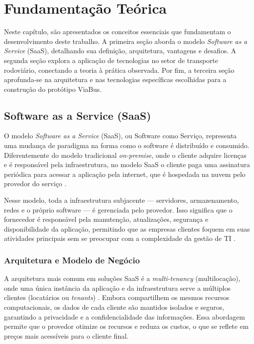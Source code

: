 \chapter{Fundamentação Teórica}\label{cha:fundamentacao_teorica}

Neste capítulo, são apresentados os conceitos essenciais que fundamentam o desenvolvimento deste trabalho. A primeira seção aborda o modelo \textit{Software as a Service} (SaaS), detalhando sua definição, arquitetura, vantagens e desafios. A segunda seção explora a aplicação de tecnologias no setor de transporte rodoviário, conectando a teoria à prática observada. Por fim, a terceira seção aprofunda-se na arquitetura e nas tecnologias específicas escolhidas para a construção do protótipo ViaBus.

\section{Software as a Service (SaaS)}

O modelo \textit{Software as a Service} (SaaS), ou Software como Serviço, representa uma mudança de paradigma na forma como o software é distribuído e consumido. Diferentemente do modelo tradicional \textit{on-premise}, onde o cliente adquire licenças e é responsável pela infraestrutura, no modelo SaaS o cliente paga uma assinatura periódica para acessar a aplicação pela internet, que é hospedada na nuvem pelo provedor do serviço \cite{moveideias2025saas}.

Nesse modelo, toda a infraestrutura subjacente — servidores, armazenamento, redes e o próprio software — é gerenciada pelo provedor. Isso significa que o fornecedor é responsável pela manutenção, atualizações, segurança e disponibilidade da aplicação, permitindo que as empresas clientes foquem em suas atividades principais sem se preocupar com a complexidade da gestão de TI \cite{moveideias2025saas}.

\subsection{Arquitetura e Modelo de Negócio}

A arquitetura mais comum em soluções SaaS é a \textit{multi-tenancy} (multilocação), onde uma única instância da aplicação e da infraestrutura serve a múltiplos clientes (locatários ou \textit{tenants}) \cite{frontegg2021multitenant}. Embora compartilhem os mesmos recursos computacionais, os dados de cada cliente são mantidos isolados e seguros, garantindo a privacidade e a confidencialidade das informações. Essa abordagem permite que o provedor otimize os recursos e reduza os custos, o que se reflete em preços mais acessíveis para o cliente final.

